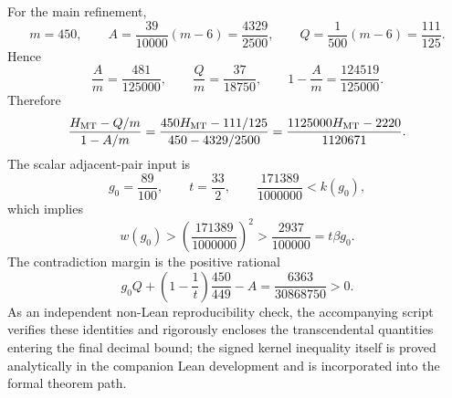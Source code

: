 \documentclass[11pt]{article}
\begin{document}
For the main refinement,
\[
 m=450,\qquad
 A=\frac{39}{10000}(m-6)=\frac{4329}{2500},\qquad
 Q=\frac1{500}(m-6)=\frac{111}{125}.
\]
Hence
\[
 \frac{A}{m}=\frac{481}{125000},\qquad
 \frac{Q}{m}=\frac{37}{18750},\qquad
 1-\frac{A}{m}=\frac{124519}{125000}.
\]
Therefore
\[
 \frac{H_{\rm MT}-Q/m}{1-A/m}
 =
 \frac{450H_{\rm MT}-111/125}{450-4329/2500}
 =
 \frac{1125000H_{\rm MT}-2220}{1120671}.
\]
The scalar adjacent-pair input is
\[
 g_0=\frac{89}{100},\qquad t=\frac{33}{2},
 \qquad
 \frac{171389}{1000000}<k(g_0),
\]
which implies
\[
 w(g_0)>\left(\frac{171389}{1000000}\right)^2
 >\frac{2937}{100000}=t\beta g_0.
\]
The contradiction margin is the positive rational
\[
 g_0Q+\left(1-\frac1t\right)\frac{450}{449}-A
 =
 \frac{6363}{30868750}>0.
\]
As an independent non-Lean reproducibility check, the accompanying script
 verifies these identities and rigorously
encloses the transcendental quantities entering the final decimal bound; the
signed kernel inequality itself is proved analytically in the companion Lean
development and is incorporated into the formal theorem path.
\end{document}
